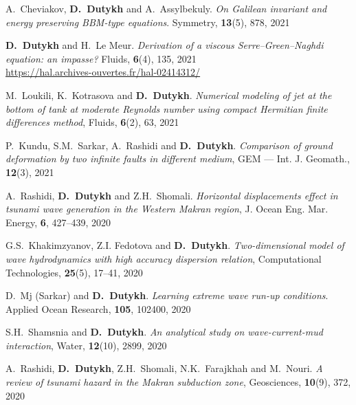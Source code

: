 \documentclass[final, a4paper, oneside, 12pt]{article}
\numberwithin{equation}{section}
\begin{document}
\begin{etaremune}
  \item A.~Cheviakov, \textbf{D.~Dutykh} and A.~Assylbekuly. \textit{On Galilean invariant and energy preserving BBM-type equations}. Symmetry, \textbf{13}(5), 878, 2021 %
  
  \item \textbf{D.~Dutykh} and H.~Le Meur. \textit{Derivation of a viscous Serre--Green--Naghdi equation: an impasse?} Fluids, \textbf{6}(4), 135, 2021 \\ %
  \url{https://hal.archives-ouvertes.fr/hal-02414312/}
  
  \item M.~Loukili, K.~Kotrasova and \textbf{D.~Dutykh}. \textit{Numerical modeling of jet at the bottom of tank at moderate Reynolds number using compact Hermitian finite differences method}, Fluids, \textbf{6}(2), 63, 2021 %
  
  \item P.~Kundu, S.M.~Sarkar, A.~Rashidi and \textbf{D.~Dutykh}. \textit{Comparison of ground deformation by two infinite faults in different medium}, GEM --- Int. J. Geomath., \textbf{12}(3), 2021 %
  
  
  \item A.~Rashidi, \textbf{D.~Dutykh} and Z.H.~Shomali. \textit{Horizontal displacements effect in tsunami wave generation in the Western Makran region}, J. Ocean Eng. Mar. Energy, \textbf{6}, 427--439, 2020 %
  
  \item G.S.~Khakimzyanov, Z.I. Fedotova and \textbf{D.~Dutykh}. \textit{Two-dimensional model of wave hydrodynamics with high accuracy dispersion relation}, Computational Technologies, \textbf{25}(5), 17--41, 2020 %
  
  \item D.~Mj (Sarkar) and \textbf{D.~Dutykh}. \textit{Learning extreme wave run-up conditions}. Applied Ocean Research, \textbf{105}, 102400, 2020 %
  
  \item S.H.~Shamsnia and \textbf{D.~Dutykh}. \textit{An analytical study on wave-current-mud interaction}, Water, \textbf{12}(10), 2899, 2020 %
  
  \item A.~Rashidi, \textbf{D.~Dutykh}, Z.H.~Shomali, N.K.~Farajkhah and M.~Nouri. \textit{A review of tsunami hazard in the Makran subduction zone}, Geosciences, \textbf{10}(9), 372, 2020 %
  

\end{etaremune}
\end{document}
